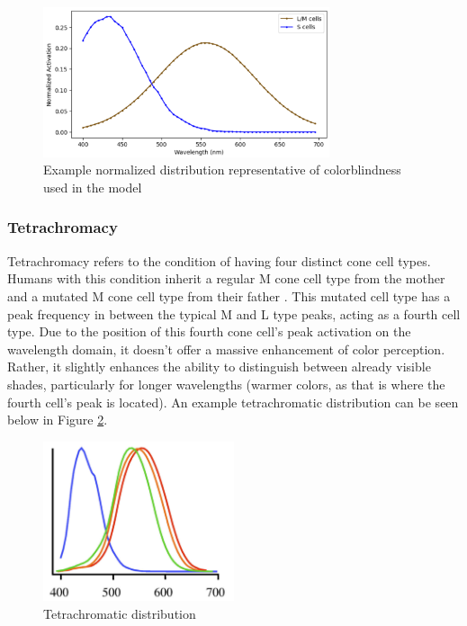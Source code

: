 \documentclass[titlepage]{article}
\begin{document}
\begin{figure}[H]
    \centering
    \includegraphics[width=0.75\textwidth]{figs/our_dichromatic.png}
    \caption{Example normalized distribution representative of colorblindness used in the model}
    \label{fig:our_dichromatic}
\end{figure}

\subsubsection{Tetrachromacy}

Tetrachromacy refers to the condition of having four distinct cone cell types. Humans with this condition inherit a regular M cone cell type from the mother and a mutated M cone cell type from their father \cite{tetragenetics}. This mutated cell type has a peak frequency in between the typical M and L type peaks, acting as a fourth cell type. Due to the position of this fourth cone cell's peak activation on the wavelength domain, it doesn't offer a massive enhancement of color perception. Rather, it slightly enhances the ability to distinguish between already visible shades, particularly for longer wavelengths (warmer colors, as that is where the fourth cell's peak is located). An example tetrachromatic distribution can be seen below in Figure \ref{fig:tetrachromatic_distribution}. 

\begin{figure}[H]
    \centering
    \includegraphics[width=0.5\textwidth]{figs/tetrachromatic_distribution.png}
    \caption{Tetrachromatic distribution \cite{tetragraph}}
    \label{fig:tetrachromatic_distribution}
\end{figure}
\end{document}
